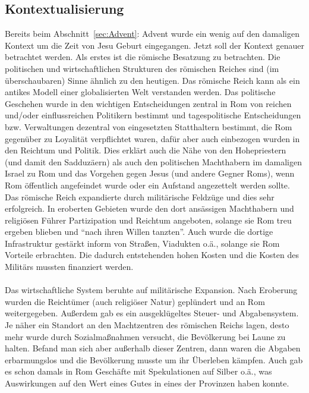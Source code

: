\subsection{Kontextualisierung}
Bereits beim Abschnitt\ \ref{sec:Advent}: Advent wurde ein wenig auf den damaligen Kontext um die Zeit von Jesu Geburt eingegangen. Jetzt soll der Kontext genauer betrachtet werden. Als erstes ist die römische Besatzung zu betrachten. Die politischen und wirtschaftlichen Strukturen des römischen Reiches sind (im überschaubaren) Sinne ähnlich zu den heutigen. Das römische Reich kann als ein antikes Modell einer globalisierten Welt verstanden werden. Das politische Geschehen wurde in den wichtigen Entscheidungen zentral in Rom von reichen und/oder einflussreichen Politikern bestimmt und tagespolitische Entscheidungen bzw. Verwaltungen dezentral von eingesetzten Statthaltern bestimmt, die Rom gegenüber zu Loyalität verpflichtet waren, dafür aber auch einbezogen wurden in den Reichtum und Politik. Dies erklärt auch die Nähe von den Hohepriestern (und damit den Sadduzäern) als auch den politischen Machthabern im damaligen Israel zu Rom und das Vorgehen gegen Jesus (und andere Gegner Roms), wenn Rom öffentlich angefeindet wurde oder ein Aufstand angezettelt werden sollte.
\\
Das römische Reich expandierte durch militärische Feldzüge und dies sehr erfolgreich. In eroberten Gebieten wurde den dort ansässigen Machthabern und religiösen Führer Partizipation und Reichtum angeboten, solange sie Rom treu ergeben blieben und ``nach ihren Willen tanzten''. Auch wurde die dortige Infrastruktur gestärkt inform von Straßen, Viadukten o.ä., solange sie Rom Vorteile erbrachten. Die dadurch entstehenden hohen Kosten und die Kosten des Militärs mussten finanziert werden.
\\~\\
Das wirtschaftliche System beruhte auf militärische Expansion. Nach Eroberung wurden die Reichtümer (auch religiöser Natur) geplündert und an Rom weitergegeben. Außerdem gab es ein ausgeklügeltes Steuer- und Abgabensystem. Je näher ein Standort an den Machtzentren des römischen Reichs lagen, desto mehr wurde durch Sozialmaßnahmen versucht, die Bevölkerung bei Laune zu halten. Befand man sich aber außerhalb dieser Zentren, dann waren die Abgaben erbarmungslos und die Bevölkerung musste um ihr Überleben kämpfen. Auch gab es schon damals in Rom Geschäfte mit Spekulationen auf Silber o.ä., was Auswirkungen auf den Wert eines Gutes in eines der Provinzen haben konnte.    
\\~\\
